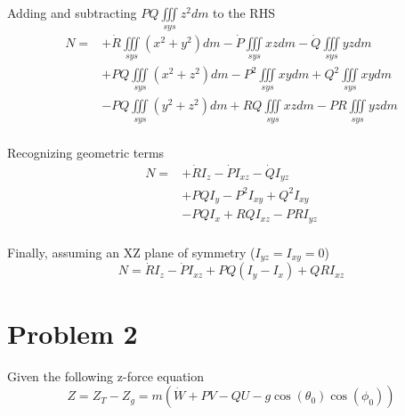 \documentclass[a4paper]{article}
\begin{document}
\noindent Adding and subtracting $ P Q \iiint\limits_{sys} z^2 dm $ to the RHS
\begin{equation*}
\begin{split}
N =  & + \dot{R} \iiint\limits_{sys} (x^2 + y^2) dm
            - \dot{P} \iiint\limits_{sys} x z dm
            - \dot{Q} \iiint\limits_{sys} y z dm \\
     &      +     P Q \iiint\limits_{sys} (x^2 + z^2) dm 
            -     P^2 \iiint\limits_{sys} x y dm 
            +     Q^2 \iiint\limits_{sys} x y dm \\
     &      -     P Q \iiint\limits_{sys} (y^2 + z^2) dm 
            +     R Q \iiint\limits_{sys} x z dm 
            -     P R \iiint\limits_{sys} y z dm \\
\end{split}
\end{equation*}

\noindent Recognizing geometric terms
\begin{equation*}
\begin{split}
N = & +\dot{R} I_z
    - \dot{P} I_{x z}
    - \dot{Q} I_{y z} \\
    & + P Q I_{y} 
      - P^2 I_{x y} 
      + Q^2 I_{x y} \\
    & - P Q I_{x} 
      + R Q I_{x z} 
      - P R I_{y z} \\
\end{split}
\end{equation*}

\noindent Finally, assuming an XZ plane of symmetry ($I_{yz} = I_{xy} = 0$)
\begin{equation*}
N =     \dot{R} I_z
      - \dot{P} I_{x z}
      + P Q (I_{y} - I_{x}) 
      + Q R I_{x z} 
\end{equation*}

\section{Problem 2}
\noindent Given the following z-force equation
\begin{equation*}
Z = Z_T - Z_g = m (\dot{W} + PV - QU - g\cos(\theta_0)\cos(\phi_0))
\end{equation*}
\end{document}
